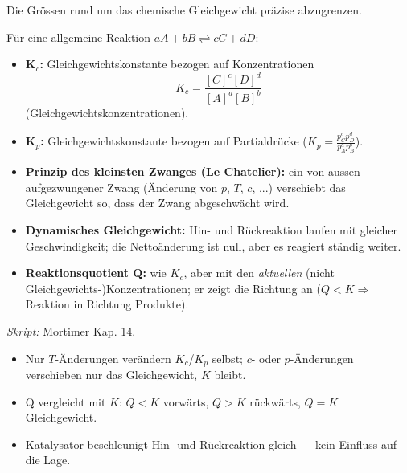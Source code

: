 

Die Grössen rund um das chemische Gleichgewicht präzise abzugrenzen.

\begin{werkzeugkasten}
Für eine allgemeine Reaktion $aA + bB \rightleftharpoons cC + dD$:
\begin{itemize}
  \item \textbf{K$_c$:} Gleichgewichtskonstante bezogen auf
        Konzentrationen
        \[
          K_c = \frac{[C]^c[D]^d}{[A]^a[B]^b}
        \]
        (Gleichgewichtskonzentrationen).
  \item \textbf{K$_p$:} Gleichgewichtskonstante bezogen auf Partialdrücke
        ($K_p = \frac{p_C^c p_D^d}{p_A^a p_B^b}$).
  \item \textbf{Prinzip des kleinsten Zwanges (Le Chatelier):} ein von aussen
        aufgezwungener Zwang (Änderung von $p$, $T$, $c$, ...) verschiebt
        das Gleichgewicht so, dass der Zwang abgeschwächt wird.
  \item \textbf{Dynamisches Gleichgewicht:} Hin- und Rückreaktion laufen
        mit gleicher Geschwindigkeit; die Nettoänderung ist null, aber es
        reagiert ständig weiter.
  \item \textbf{Reaktionsquotient Q:} wie $K_c$, aber mit den
        \emph{aktuellen} (nicht Gleichgewichts-)Konzentrationen; er zeigt
        die Richtung an ($Q<K \Rightarrow$ Reaktion in Richtung Produkte).
\end{itemize}
\textit{Skript:} Mortimer Kap. 14.
\end{werkzeugkasten}

\begin{achtung}
\begin{itemize}
  \item Nur $T$-Änderungen verändern $K_c$/$K_p$ selbst; $c$- oder
        $p$-Änderungen verschieben nur das Gleichgewicht, $K$ bleibt.
  \item Q vergleicht mit $K$: $Q<K$ vorwärts, $Q>K$ rückwärts, $Q=K$
        Gleichgewicht.
  \item Katalysator beschleunigt Hin- und Rückreaktion gleich --- kein
        Einfluss auf die Lage.
\end{itemize}
\end{achtung}
